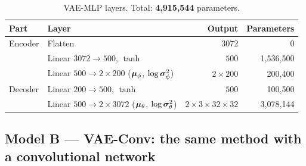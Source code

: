 \begin{table}[H]
\centering\small
\caption{VAE-MLP layers. Total: \textbf{4,915,544} parameters.}
\label{tab:arch-mlp}
\begin{tabular}{@{}llrr@{}}
\toprule
Part & Layer & Output & Parameters\\
\midrule
Encoder & Flatten & $3072$ & 0\\
        & Linear $3072\to500$, $\tanh$ & $500$ & 1,536,500\\
        & Linear $500\to2\times200$ ($\bm{\mu}_\phi$, $\log\bm{\sigma}_\phi^2$) & $2\times200$ & 200,400\\
\midrule
Decoder & Linear $200\to500$, $\tanh$ & $500$ & 100,500\\
        & Linear $500\to2\times3072$ ($\bm{\mu}_\theta$, $\log\bm{\sigma}_\theta^2$) & $2\times3\times32\times32$ & 3,078,144\\
\bottomrule
\end{tabular}
\end{table}

\subsection{Model B --- VAE-Conv: the same method with a convolutional network}
\label{sec:arch-conv}

